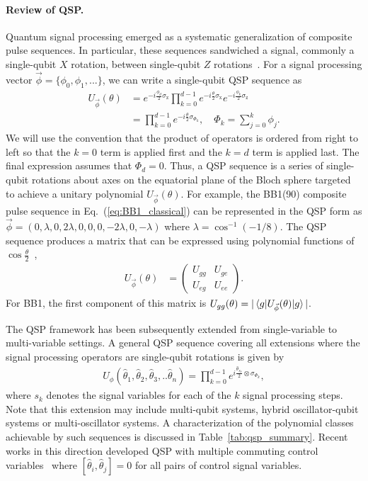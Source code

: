 \documentclass[aps,prx,showpacs,notitlepage,twocolumn,superscriptaddress,nofootinbib,preprintnumbers,floatfix,10pt, longbibliography]{revtex4-2}
\begin{document}
\paragraph{Review of QSP.} Quantum signal processing emerged as a systematic generalization of composite pulse sequences. In particular, these sequences sandwiched a signal, commonly a single-qubit $X$ rotation, between single-qubit $Z$ rotations~\cite{low2016methodology}. For a signal processing vector $\vec{\phi}=\{\phi_0,\phi_1,...\}$, we can write a single-qubit QSP sequence as
\begin{align}
    U_{\vec{\phi}}(\theta)&=e^{-i\frac{\phi_d}{2}\sigma_\mathrm{z}}\prod^{d-1}_{k=0} e^{-i\frac{\theta}{2}\sigma_\mathrm{x}}e^{-i\frac{\phi_k}{2}\sigma_\mathrm{z}} \\
    &=\prod^{d-1}_{k=0} e^{-i\frac{\theta}{2}\sigma_{\Phi_k}}, \quad \Phi_k=\sum_{j=0}^k \phi_j.\label{eq:single-QSP}
\end{align}
We will use the convention that the product of operators is ordered from right to left so that the $k=0$ term is applied first and the $k=d$ term is applied last. The final expression assumes that $\Phi_d=0$. Thus, a QSP sequence is a series of single-qubit rotations about axes on the equatorial plane of the Bloch sphere targeted to achieve a unitary polynomial $U_{\vec{\phi}}(\theta)$. For example, the BB1(90) composite pulse sequence in Eq.~(\ref{eq:BB1_classical}) can be represented in the QSP form as $\vec{\phi}=(0,\lambda,0,2\lambda,0,0,0,-2\lambda,0,-\lambda)$ where $\lambda=\cos^{-1}(-1/8)$. The QSP sequence produces a matrix that can be expressed using polynomial functions of $\cos\frac{\theta}{2}$~\cite{martyn2021grand}, \begin{align}
  U_{\vec{\phi}}(\theta) &= \left( \begin{array}{cc} U_{gg}&U_{ge}\\U_{eg}&U_{ee}  \end{array} \right).\label{eq:Umatrix-QSP}
\end{align}
 For BB1, the first component of this matrix is $U_{gg}(\theta)=|\braket{g|U_{\vec{\phi}}(\theta)|g}|$.

The QSP framework has been subsequently extended from single-variable to multi-variable settings. A general QSP sequence covering all extensions where the signal processing operators are single-qubit rotations is given by
\begin{align}
    U_\phi(\hat\theta_1,\hat \theta_2,\hat \theta_3,..\hat\theta_n)=\prod^{d-1}_{k=0} e^{i\frac{\hat\theta_{s_k}}{2}\otimes\sigma_{\Phi_{k}}},\label{eq:multi-QSP}
\end{align}
where $s_k$ denotes the signal variables for each of the $k$ signal processing steps. Note that this extension may include multi-qubit systems, hybrid oscillator-qubit systems or multi-oscillator systems. A characterization of the polynomial classes achievable by such sequences is discussed in Table~\ref{tab:qsp_summary}. Recent works in this direction developed QSP with multiple commuting control variables~\cite{nemeth2023variants,rossi2022multivariable} where $[\hat\theta_i,\hat\theta_j]=0$ for all pairs of control signal variables.
\end{document}
